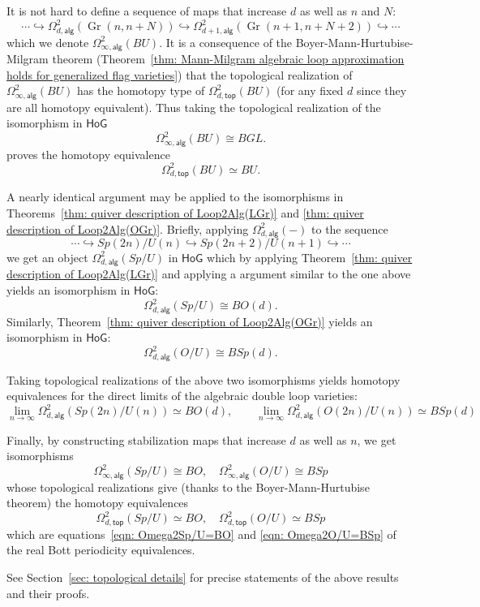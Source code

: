 \message{ !name(Bryan-Vakil.tex)}\documentclass{amsart}
\theoremstyle{definition}
\newcommand{\HoG}{\textsf{HoG}}
\newcommand{\alg}{\mathsf{alg}}
\renewcommand{\top}{\mathsf{top}}
\newcommand{\Gr}{\operatorname{Gr}}
\newcommand{\LoopTwo}{\Omega^{2}_{d,\alg}}
\newcommand{\LoopTwoTop}{\Omega^{2}_{d,\top}}
\newcommand{\homotopyeq}{\simeq}
\begin{document}
It is not hard to define a sequence of maps that increase $d$ as well as $n$ and
$N$:
\[
\dotsb \hookrightarrow \LoopTwo (\Gr (n,n+N))\hookrightarrow
\Omega^{2}_{d+1,\alg} (\Gr (n+1,n+N+2))\hookrightarrow \dotsb
\]
which we denote $\Omega^{2}_{\infty ,\alg}(BU)$. It is a consequence
of the Boyer-Mann-Hurtubise-Milgram theorem (Theorem~\ref{thm:
Mann-Milgram algebraic loop approximation holds for generalized flag
varieties}) that the topological realization of $\Omega^{2}_{\infty
,\alg}(BU)$ has the homotopy type of $\LoopTwoTop (BU)$ (for any fixed
$d$ since they are all homotopy equivalent). Thus taking the
topological realization of the isomorphism
in $\HoG$ 
\[
\Omega^{2}_{\infty ,\alg } (BU)\cong BGL. 
\]
proves the homotopy equivalence
\[
\LoopTwoTop (BU)\homotopyeq BU .
\]

A nearly identical argument may be applied to the isomorphisms in
Theorems~\ref{thm: quiver description of Loop2Alg(LGr)} and \ref{thm:
quiver description of Loop2Alg(OGr)}. Briefly, applying $\LoopTwo (-)$
to the sequence
\[
\dotsb \hookrightarrow Sp(2n)/U(n) \hookrightarrow Sp(2n+2)/U(n+1) \hookrightarrow \dotsb 
\]
we get an object $\LoopTwo (Sp/U)$ in $\HoG$ which by applying
Theorem~\ref{thm: quiver description of Loop2Alg(LGr)} and applying a
argument similar to the one above yields an isomorphism in $\HoG$:
\[
\LoopTwo (Sp/U) \cong BO(d) . 
\]
Similarly, Theorem~\ref{thm: quiver description of Loop2Alg(OGr)}
yields an isomorphism in $\HoG $:
\[
\LoopTwo (O/U) \cong BSp(d) . 
\]

Taking topological realizations of the above two isomorphisms yields
homotopy equivalences for the direct limits of the algebraic double
loop varieties:
\[
\lim_{n\to \infty} \LoopTwo (Sp(2n)/U(n)) \homotopyeq BO(d),\quad
\quad \lim_{n\to \infty} \LoopTwo (O(2n)/U(n)) \homotopyeq BSp(d)
\]



Finally, by constructing stabilization maps that increase $d$ as well
as $n$, we get isomorphisms
\[
\Omega^{2}_{\infty ,\alg } (Sp/U) \cong BO, \quad \Omega^{2}_{\infty ,\alg } (O/U) \cong BSp 
\]
whose topological realizations give (thanks to the
Boyer-Mann-Hurtubise theorem) the homotopy equivalences
\[
\LoopTwoTop (Sp/U)\homotopyeq BO, \quad \LoopTwoTop (O/U)\homotopyeq
BSp
\]
which are equations~\eqref{eqn: Omega2Sp/U=BO} and \eqref{eqn:
Omega2O/U=BSp} of the real Bott periodicity equivalences.

See Section~\ref{sec: topological details} for precise statements of
the above results and their proofs.
\end{document}
